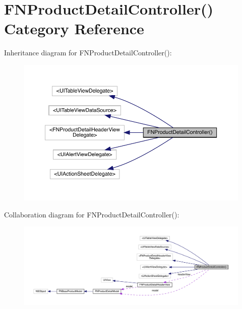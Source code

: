 \hypertarget{category_f_n_product_detail_controller_07_08}{}\section{F\+N\+Product\+Detail\+Controller() Category Reference}
\label{category_f_n_product_detail_controller_07_08}


Inheritance diagram for F\+N\+Product\+Detail\+Controller()\+:\nopagebreak
\begin{figure}[H]
\begin{center}
\leavevmode
\includegraphics[width=350pt]{category_f_n_product_detail_controller_07_08__inherit__graph}
\end{center}
\end{figure}


Collaboration diagram for F\+N\+Product\+Detail\+Controller()\+:\nopagebreak
\begin{figure}[H]
\begin{center}
\leavevmode
\includegraphics[width=350pt]{category_f_n_product_detail_controller_07_08__coll__graph}
\end{center}
\end{figure}
